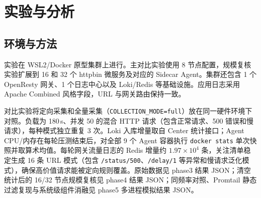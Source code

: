 \section{实验与分析}

\subsection{环境与方法}
实验在 WSL2/Docker 原型集群上进行。主对比实验使用 8 节点配置，规模复核实验扩展到 16 和 32 个 httpbin 微服务及对应的 Sidecar Agent。集群还包含 1 个 OpenResty 网关、1 个日志中心以及 Loki/Redis 等基础设施。应用日志采用 Apache Combined 风格字段，URL 与网关路由保持一致。

对比实验将定向采集和全量采集（\texttt{COLLECTION\_MODE=full}）放在同一硬件环境下对照。负载为 180\,s、并发 50 的混合 HTTP 请求（包含正常请求、500 错误和慢请求），每种模式独立重复 3 次。Loki 入库增量取自 Center 统计接口；Agent CPU/内存在每轮压测结束后，对全部 9 个 Agent 容器执行 \texttt{docker stats} 单次快照并取算术均值。每轮网关流量日志的 Redis 增量约 $1.97\times10^4$ 条，关注清单稳定生成 16 条 URL 模式（包含 \texttt{/status/500}、\texttt{/delay/1} 等异常和慢请求泛化模式），确保高价值请求能被定向规则覆盖。原始数据见 phase3 结果 JSON；清空统计后的 16/32 节点规模复核见 phase4 结果 JSON；同频率对照、Promtail 静态过滤复现与系统级组件消融见 phase5 多进程模拟结果 JSON。

